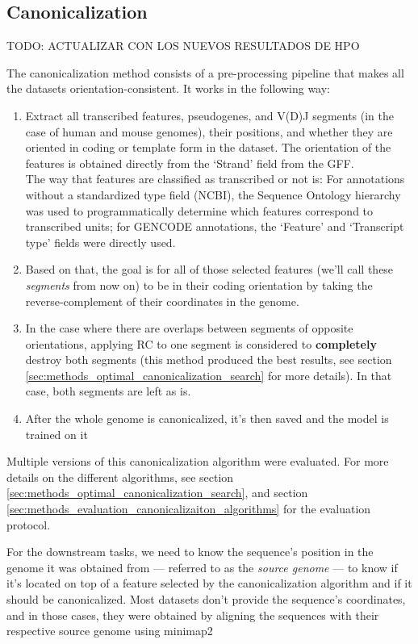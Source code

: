 \documentclass[   ]{article}
\begin{document}
\subsection{Canonicalization}
\label{sec:methods_canonicalization}

TODO: ACTUALIZAR CON LOS NUEVOS RESULTADOS DE HPO

The canonicalization method consists of a pre-processing pipeline that makes all the datasets orientation-consistent. It works in the following way:
\begin{enumerate}
	\def\labelenumi{\arabic{enumi}.}
	\item Extract all transcribed features, pseudogenes, and V(D)J segments (in the case of human and mouse genomes), their
	positions, and whether they are oriented in coding or template form in
	the dataset. The orientation of the features is obtained directly from
	the `Strand' field from the GFF.
	\\
	The way that features are classified as transcribed or not is: For annotations without a
	standardized type field (NCBI), the Sequence Ontology hierarchy
	\citep{eilbeckSequenceOntologyTool2005} was used to programmatically
	determine which features correspond to transcribed units; for GENCODE
	annotations, the `Feature' and `Transcript type' fields were directly used.
	\item
	Based on that, the goal is for all of those selected features (we'll call these \emph{segments} from now on) to be in their coding
	orientation by taking the reverse-complement of
	their coordinates in the genome.
	\item
	In the case where there are overlaps between segments of opposite
	orientations, applying RC to one segment is considered to
	\textbf{completely} destroy both segments (this method produced the best results, see section \ref{sec:methods_optimal_canonicalization_search} for more details). In that case, both segments are left as is.
	\item After the whole genome is canonicalized, it's then saved and the model is trained on it
\end{enumerate}

Multiple versions of this canonicalization algorithm were evaluated. For more details on the different algorithms, see section \ref{sec:methods_optimal_canonicalization_search}, and section \ref{sec:methods_evaluation_canonicalizaiton_algorithms} for the evaluation protocol.

For the downstream tasks, we need to know the sequence's position in the genome it was obtained from --- referred to as the \emph{source genome} --- to know if it's located on top of a feature selected by the canonicalization algorithm and if it should be canonicalized. Most datasets don't provide the sequence's coordinates, and in those cases, they were obtained by aligning the sequences with their respective source genome using minimap2 \citep{liMinimap2PairwiseAlignment2018}
\end{document}

